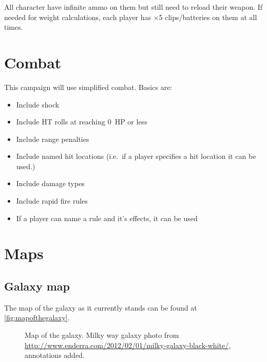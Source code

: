 All character have infinite ammo on them but still need to reload their weapon.
If needed for weight calculations, each player has ×5 clips/batteries on them at
all times.


\section{Combat}
\label{sec:combat}

This campaign will use simplified \gurps combat. Basics are:

\begin{itemize}
\item Include shock
\item Include HT rolls at reaching 0~HP or less
\item Include range penalties
\item Include named hit locations (i.e.~if a player specifies a hit location it
  can be used.)
\item Include damage types
\item Include rapid fire rules
\item If a player can name a rule and it's effects, it can be used
\end{itemize}


\section{Maps}
\label{sec:maps}


\subsection{Galaxy map}
\label{sec:galaxy-map}

The map of the galaxy as it currently stands can be found at \autoref{fig:mapofthegalaxy}.

\begin{figure*}
  \centering
  \caption{Map of the galaxy. Milky way galaxy photo from
    \url{http://www.enderra.com/2012/02/01/milky-galaxy-black-white/},
    annotations added.}
  \label{fig:mapofthegalaxy}
\end{figure*}

